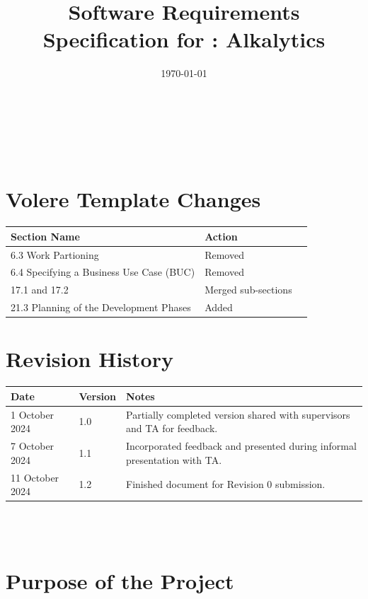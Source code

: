 \documentclass[12pt]{article}
\begin{document}
\title{Software Requirements Specification for \progname: Alkalytics} 
\author{\authname}
\date{\today}
	
\maketitle

~\newpage


\tableofcontents

~\newpage

\listoffigures
\listoftables

\section*{Volere Template Changes}
\begin{tabularx}{\textwidth}{p{8cm}p{4cm}X} \toprule
  {\textbf{Section Name}} & {\textbf{Action}}\\
  \midrule
  6.3 Work Partioning & Removed\\
  6.4 Specifying a Business Use Case (BUC) & Removed\\
  17.1 and 17.2 & Merged sub-sections\\
  21.3 Planning of the Development Phases & Added\\
  \bottomrule
\end{tabularx}

\newpage
\section*{Revision History}

  \begin{tabularx}{\textwidth}{p{3cm}p{2cm}X} \toprule {\textbf{Date}} &
  {\textbf{Version}} & {\textbf{Notes}}\\
  \midrule
  1 October 2024 & 1.0 & Partially completed version shared with supervisors and TA for feedback.\\
  7 October 2024 & 1.1 & Incorporated feedback and presented during informal presentation with TA.\\
  11 October 2024 & 1.2 & Finished document for Revision 0 submission.\\
  \bottomrule
  \end{tabularx}

~\\

~\newpage
\section{Purpose of the Project}
\end{document}
